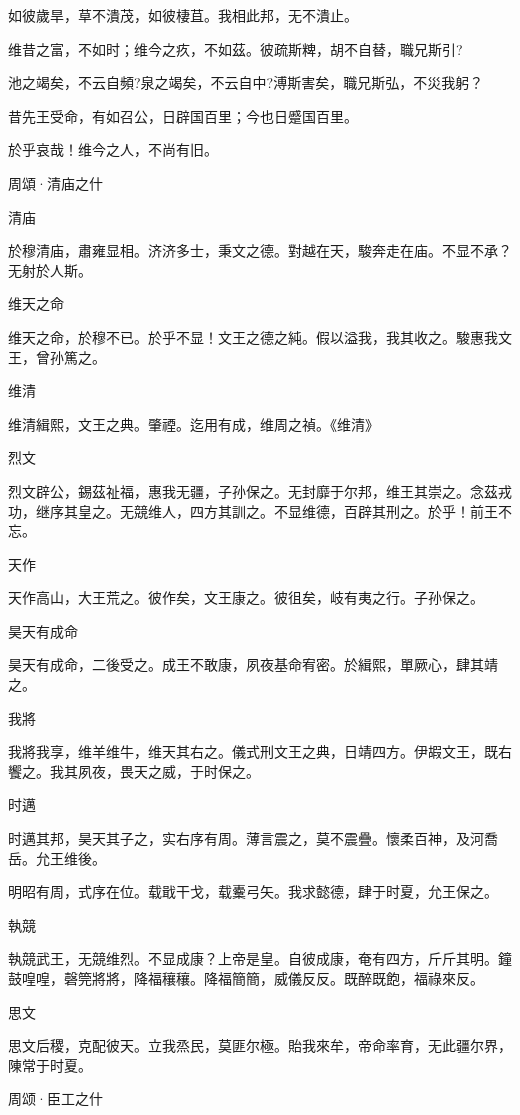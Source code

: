 如彼歲旱，草不潰茂，如彼棲苴。我相此邦，无不潰止。

维昔之富，不如时；维今之疚，不如茲。彼疏斯粺，胡不自替，職兄斯引?

池之竭矣，不云自頻?泉之竭矣，不云自中?溥斯害矣，職兄斯弘，不災我躬？

昔先王受命，有如召公，日辟国百里；今也日蹙国百里。

於乎哀哉！维今之人，不尚有旧。




周頌·清庙之什

清庙

於穆清庙，肅雍显相。济济多士，秉文之德。對越在天，駿奔走在庙。不显不承？无射於人斯。

维天之命

维天之命，於穆不已。於乎不显！文王之德之純。假以溢我，我其收之。駿惠我文王，曾孙篤之。

维清

维清緝熙，文王之典。肇禋。迄用有成，维周之禎。《维清》

烈文

烈文辟公，錫茲祉福，惠我无疆，子孙保之。无封靡于尔邦，维王其崇之。念茲戎功，继序其皇之。无競维人，四方其訓之。不显维德，百辟其刑之。於乎！前王不忘。

天作

天作高山，大王荒之。彼作矣，文王康之。彼徂矣，岐有夷之行。子孙保之。

昊天有成命

昊天有成命，二後受之。成王不敢康，夙夜基命宥密。於緝熙，單厥心，肆其靖之。

我將

我將我享，维羊维牛，维天其右之。儀式刑文王之典，日靖四方。伊嘏文王，既右饗之。我其夙夜，畏天之威，于时保之。

时邁

时邁其邦，昊天其子之，实右序有周。薄言震之，莫不震疊。懷柔百神，及河喬岳。允王维後。

明昭有周，式序在位。载戢干戈，载櫜弓矢。我求懿德，肆于时夏，允王保之。

執競

執競武王，无競维烈。不显成康？上帝是皇。自彼成康，奄有四方，斤斤其明。鐘鼓喤喤，磬筦將將，降福穰穰。降福簡簡，威儀反反。既醉既飽，福祿來反。

思文

思文后稷，克配彼天。立我烝民，莫匪尔極。貽我來牟，帝命率育，无此疆尔界，陳常于时夏。




周颂·臣工之什


